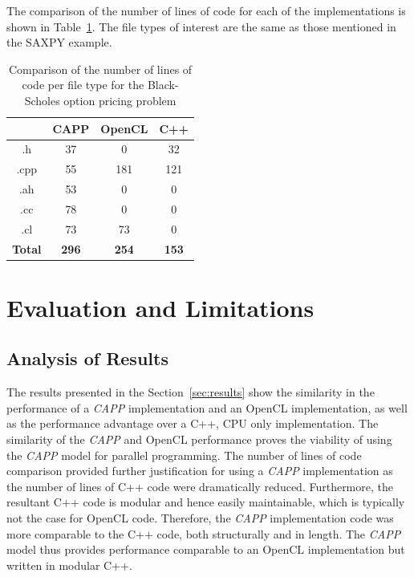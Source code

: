 \documentclass{sig-alternate-05-2015}
\begin{document}
The comparison of the number of lines of code for each of the implementations is
shown in Table~\ref{tab:blackscholes}. The file types of interest are the same as 
those mentioned in the SAXPY example. 

\begin{table}[!b]
\centering
\caption{Comparison of the number of lines of code per file type for the
Black-Scholes option pricing problem }
\label{tab:blackscholes}
\begin{tabular}{|c|c|c|c|} 
	\hline
				& CAPP			& OpenCL		& C++		\\ \hline
.h				& 37			& 0				& 32		\\ \hline
.cpp			& 55			& 181			& 121		\\ \hline
.ah				& 53			& 0				& 0			\\ \hline
.cc				& 78			& 0				& 0			\\ \hline
.cl				& 73			& 73			& 0			\\ \hline
\textbf{Total}	& \textbf{296}	& \textbf{254}	& \textbf{153}		\\ \hline		
\hline
\end{tabular}
\end{table}


\section{Evaluation and Limitations}\label{sec:evaluation}

\subsection{Analysis of Results}

The results presented in the Section~\ref{sec:results} show the similarity in
the performance of a \textit{CAPP} implementation and an OpenCL implementation, as
well as the performance advantage over a C++, CPU only implementation. The
similarity of the \textit{CAPP} and OpenCL performance proves the viability of
using the \textit{CAPP} model for parallel programming. The number of lines of 
code comparison provided further justification for using a \textit{CAPP}
implementation as the number of lines of C++ code were dramatically reduced.
Furthermore, the resultant C++ code is modular and hence easily maintainable, 
which is typically not the case for OpenCL code. Therefore,
the \textit{CAPP} implementation code was more comparable to the C++ code,
both structurally and in length. The \textit{CAPP} model thus provides
performance comparable to an OpenCL implementation but written in modular C++.
\end{document}
